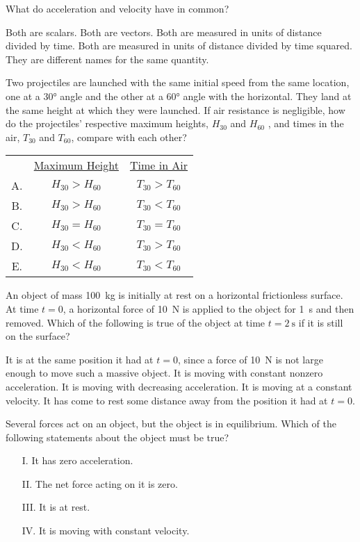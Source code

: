\documentclass[12pt]{exam}
\begin{document}
\begin{questions}
  \question What do acceleration and velocity have in common?
  \begin{choices}
    \choice Both are scalars.
    \choice Both are vectors.
    \choice Both are measured in units of distance divided by time.
    \choice Both are measured in units of distance divided by time squared.
    \choice They are different names for the same quantity.
  \end{choices}

  \question Two projectiles are launched with the same initial speed from the
  same location, one at a \ang{30} angle and the other at a \ang{60} angle with
  the horizontal. They land at the same height at which they were launched. If
  air resistance is negligible, how do the projectiles' respective maximum
  heights, $H_{30}$ and $H_{60}$ , and times in the air, $T_{30}$ and $T_{60}$,
  compare with each other?

  \begin{tabular}{ccc}
    & \underline{Maximum Height} & \underline{Time in Air} \\
    A. & $H_{30} > H_{60}$ & $T_{30} > T_{60}$ \\
    B. & $H_{30} > H_{60}$ & $T_{30} < T_{60}$ \\
    C. & $H_{30} = H_{60}$ & $T_{30} = T_{60}$ \\
    D. & $H_{30} < H_{60}$ & $T_{30} > T_{60}$ \\
    E. & $H_{30} < H_{60}$ & $T_{30} < T_{60}$
  \end{tabular}

  \question An object of mass \SI{100}{\kilo\gram} is initially at rest on a
  horizontal frictionless surface. At time $t=0$, a horizontal force of
  \SI{10}{\newton} is applied to the object for \SI{1}{\second} and then
  removed. Which of the following is true of the object at time
  $t=\SI{2}{\second}$ if it is still on the surface?
  \begin{choices}
    \choice It is at the same position it had at $t=0$, since a force of
    \SI{10}{\newton} is not large enough to move such a massive object.
    \choice It is moving with constant nonzero acceleration.
    \choice It is moving with decreasing acceleration.
    \choice It is moving at a constant velocity.
    \choice It has come to rest some distance away from the position it had at
    $t=0$.
  \end{choices}
  \vspace{.7in}
  
  \question Several forces act on an object, but the object is in equilibrium.
  Which of the following statements about the object must be true?
  \begin{enumerate}[nosep]
  \item[I.] It has zero acceleration.
  \item[II.] The net force acting on it is zero.
  \item[III.] It is at rest.
  \item[IV.] It is moving with constant velocity.
  \end{enumerate}


\end{questions}
\end{document}
